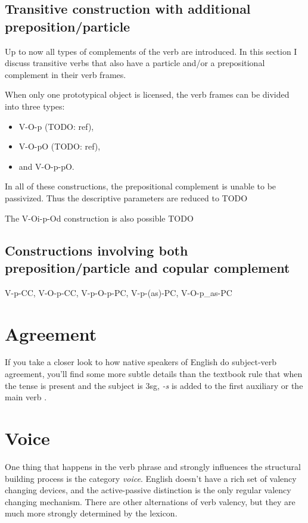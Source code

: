 \documentclass[UTF8, a4paper, oneside, scheme=plain, 12pt]{ctexbook}
\newcommand*{\citesec}[1]{\S~{#1}}
\newcommand*{\citechap}[1]{Ch.~{#1}}
\newcommand{\form}[1]{\emph{#1}}
\begin{document}
\subsection{Transitive construction with additional preposition/particle}

Up to now all types of complements of the verb are introduced.
In this section I discuss 
transitive verbs that also have a particle and/or a prepositional complement 
in their verb frames.

When only one prototypical object is licensed,
the verb frames can be divided into three types:
\begin{itemize}
    \item V-O-p (TODO: ref),
    \item V-O-pO (TODO: ref), 
    \item and V-O-p-pO.
\end{itemize}
In all of these constructions, 
the prepositional complement is unable to be passivized.
Thus the descriptive parameters are reduced to TODO 

The V-Oi-p-Od construction is also possible TODO 

\subsection{Constructions involving both preposition/particle and copular complement}

V-p-CC, V-O-p-CC, V-p-O-p-PC, V-p-(as)-PC, V-O-p_as-PC

\section{Agreement}

If you take a closer look to how native speakers of English do subject-verb agreement,
you'll find some more subtle details than 
the textbook rule that when the tense is \acl{present}
and the subject is 3sg, 
\form{-s} is added to the first auxiliary or the main verb
\citep[\citechap{5}, \citesec{18}]{cgel}.

\section{Voice} 

One thing that happens in the verb phrase 
and strongly influences the structural building process is the category \emph{voice}.
English doesn't have a rich set of valency changing devices,
and the active-passive distinction is the only regular valency changing mechanism.
There are other alternations of verb valency,
but they are much more strongly determined by the lexicon. 
\end{document}
